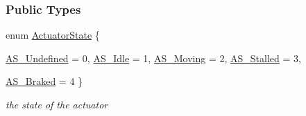 \subsubsection*{Public Types}
\begin{DoxyCompactItemize}
\item 
enum \hyperlink{classOpenRAVE_1_1SensorBase_1_1ActuatorSensorData_aff7db6eb3c126e9c2c2c116ed181fa3c}{ActuatorState} \{ \par
\hyperlink{classOpenRAVE_1_1SensorBase_1_1ActuatorSensorData_aff7db6eb3c126e9c2c2c116ed181fa3ca9db5ef562213f8bec88be67e1e2d7d10}{AS\_\-Undefined} = 0, 
\hyperlink{classOpenRAVE_1_1SensorBase_1_1ActuatorSensorData_aff7db6eb3c126e9c2c2c116ed181fa3ca94f00fffd972fc0bc603b3ea47101254}{AS\_\-Idle} = 1, 
\hyperlink{classOpenRAVE_1_1SensorBase_1_1ActuatorSensorData_aff7db6eb3c126e9c2c2c116ed181fa3ca32ea9206752f7b87d3bd9fbd85cb08f3}{AS\_\-Moving} = 2, 
\hyperlink{classOpenRAVE_1_1SensorBase_1_1ActuatorSensorData_aff7db6eb3c126e9c2c2c116ed181fa3cad320e5c2ae66e3c49f5a1771a29effd6}{AS\_\-Stalled} = 3, 
\par
\hyperlink{classOpenRAVE_1_1SensorBase_1_1ActuatorSensorData_aff7db6eb3c126e9c2c2c116ed181fa3ca083b3c14ce5e0fc3cc25f3f9f284c319}{AS\_\-Braked} = 4
 \}
\begin{DoxyCompactList}\small\item\em the state of the actuator \item\end{DoxyCompactList}\end{DoxyCompactItemize}
